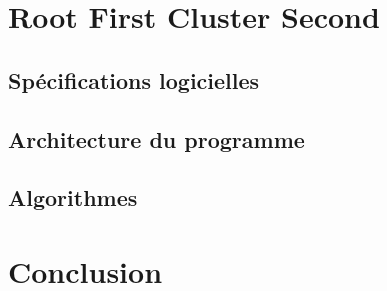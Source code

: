 \documentclass[twoside,UTF8]{EPURapport}
\begin{document}
\chapter{Root First Cluster Second}

\section{Spécifications logicielles}

\section{Architecture du programme}

\section{Algorithmes}


\chapter{Conclusion}

\end{document}
